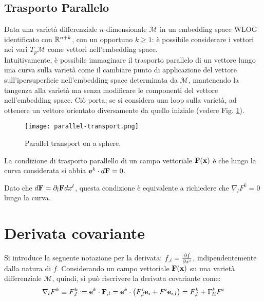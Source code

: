 \subsection{Trasporto Parallelo}

Data una varietà differenziale $ n $-dimensionale $ \mathcal{M} $ in un embedding space WLOG identificato con $ \mathbb{R}^{n+k} $, con un opportuno $ k \ge 1 $: è possibile considerare i vettori nei vari $ T_p\mathcal{M} $ come vettori nell'embedding space.\\
Intuitivamente, è possibile immaginare il trasporto parallelo di un vettore lungo una curva sulla varietà come il cambiare punto di applicazione del vettore sull'ipersuperficie nell'embedding space determinata da $ \mathcal{M} $, mantenendo la tangenza alla varietà ma senza modificare le componenti del vettore nell'embedding space. Ciò porta, se si considera una loop sulla varietà, ad ottenere un vettore orientato diversamente da quello iniziale (vedere Fig. \ref{par-tr}).
\begin{figure}
	\centering
	\texttt{[image: parallel-transport.png]}
	\caption{Parallel transport on a sphere.}
	\label{par-tr}
\end{figure}

\begin{proposition}
	La condizione di trasporto parallello di un campo vettoriale $ \mathbf{F}(\mathbf{x}) $ è che lungo la curva considerata si abbia $ \mathbf{e}^k \cdot d\mathbf{F} = 0 $.
\end{proposition}
Dato che $ d\mathbf{F} = \partial_l \mathbf{F} dx^l $, questa condizione è equivalente a richiedere che $ \nabla_l F^k = 0 $ lungo la curva.

\section{Derivata covariante}

Si introduce la seguente notazione per la derivata: $ f_{,i} = \frac{\partial f}{\partial x^i} $, indipendentemente dalla natura di $ f $.
Considerando un campo vettoriale $ \mathbf{F}(\mathbf{x}) $ su una varietà differenziale $ \mathcal{M} $, quindi, si può riscrivere la derivata covariante come:
\begin{equation}
	\nabla_l F^k \equiv F^k_{;l} \defeq \ve{e}^k \cdot \ve{F}_{,l} = \ve{e}^k \cdot \left( F^i_{,l} \ve{e}_i + F^i \ve{e}_{i,l} \right) = F^k_{,l} + \Gamma^k_{li} F^i
	\label{eq:4.7}
\end{equation}

